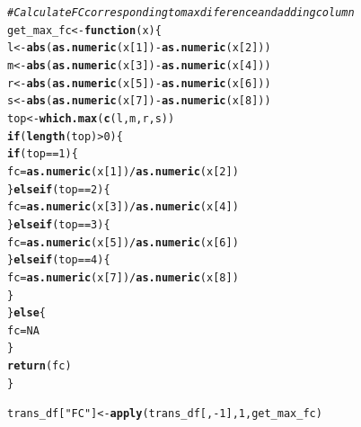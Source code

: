 \documentclass[12pt, a4paper]{article}\usepackage[]{graphicx}\usepackage[]{color}
\makeatletter
\newcommand{\hlnum}[1]{\textcolor[rgb]{0.686,0.059,0.569}{#1}}%
\newcommand{\hlstr}[1]{\textcolor[rgb]{0.192,0.494,0.8}{#1}}%
\newcommand{\hlcom}[1]{\textcolor[rgb]{0.678,0.584,0.686}{\textit{#1}}}%
\newcommand{\hlopt}[1]{\textcolor[rgb]{0,0,0}{#1}}%
\newcommand{\hlstd}[1]{\textcolor[rgb]{0.345,0.345,0.345}{#1}}%
\newcommand{\hlkwa}[1]{\textcolor[rgb]{0.161,0.373,0.58}{\textbf{#1}}}%
\newcommand{\hlkwb}[1]{\textcolor[rgb]{0.69,0.353,0.396}{#1}}%
\newcommand{\hlkwc}[1]{\textcolor[rgb]{0.333,0.667,0.333}{#1}}%
\newcommand{\hlkwd}[1]{\textcolor[rgb]{0.737,0.353,0.396}{\textbf{#1}}}%
\newenvironment{kframe}{%
 \def\at@end@of@kframe{}%
 \ifinner\ifhmode%
  \def\at@end@of@kframe{\end{minipage}}%
  \begin{minipage}{\columnwidth}%
 \fi\fi%
 \def\FrameCommand##1{\hskip\@totalleftmargin \hskip-\fboxsep
 \colorbox{shadecolor}{##1}\hskip-\fboxsep
     \hskip-\linewidth \hskip-\@totalleftmargin \hskip\columnwidth}%
 \MakeFramed {\advance\hsize-\width
   \@totalleftmargin\z@ \linewidth\hsize
   \@setminipage}}%
 {\par\unskip\endMakeFramed%
 \at@end@of@kframe}
\newenvironment{knitrout}{}{} %
\makeatother
\begin{document}
\begin{knitrout}
\begin{kframe}
\begin{alltt}
\hlcom{#Calculate FC corresponding to max diference and adding column}
\hlstd{get_max_fc} \hlkwb{<-} \hlkwa{function}\hlstd{(}\hlkwc{x}\hlstd{)\{}
  \hlstd{l} \hlkwb{<-} \hlkwd{abs}\hlstd{(}\hlkwd{as.numeric}\hlstd{(x[}\hlnum{1}\hlstd{])} \hlopt{-} \hlkwd{as.numeric}\hlstd{(x[}\hlnum{2}\hlstd{]))}
  \hlstd{m} \hlkwb{<-} \hlkwd{abs}\hlstd{(}\hlkwd{as.numeric}\hlstd{(x[}\hlnum{3}\hlstd{])} \hlopt{-} \hlkwd{as.numeric}\hlstd{(x[}\hlnum{4}\hlstd{]))}
  \hlstd{r} \hlkwb{<-} \hlkwd{abs}\hlstd{(}\hlkwd{as.numeric}\hlstd{(x[}\hlnum{5}\hlstd{])} \hlopt{-} \hlkwd{as.numeric}\hlstd{(x[}\hlnum{6}\hlstd{]))}
  \hlstd{s} \hlkwb{<-} \hlkwd{abs}\hlstd{(}\hlkwd{as.numeric}\hlstd{(x[}\hlnum{7}\hlstd{])} \hlopt{-} \hlkwd{as.numeric}\hlstd{(x[}\hlnum{8}\hlstd{]))}
  \hlstd{top} \hlkwb{<-} \hlkwd{which.max}\hlstd{(}\hlkwd{c}\hlstd{(l,m,r,s))}
  \hlkwa{if} \hlstd{(}\hlkwd{length}\hlstd{(top)} \hlopt{>} \hlnum{0}\hlstd{)\{}
    \hlkwa{if} \hlstd{(top} \hlopt{==} \hlnum{1}\hlstd{) \{}
      \hlstd{fc} \hlkwb{=} \hlkwd{as.numeric}\hlstd{(x[}\hlnum{1}\hlstd{])}\hlopt{/}\hlkwd{as.numeric}\hlstd{(x[}\hlnum{2}\hlstd{])}
    \hlstd{\}} \hlkwa{else if} \hlstd{(top} \hlopt{==} \hlnum{2}\hlstd{) \{}
      \hlstd{fc} \hlkwb{=} \hlkwd{as.numeric}\hlstd{(x[}\hlnum{3}\hlstd{])}\hlopt{/}\hlkwd{as.numeric}\hlstd{(x[}\hlnum{4}\hlstd{])}
    \hlstd{\}} \hlkwa{else if} \hlstd{(top} \hlopt{==} \hlnum{3}\hlstd{) \{}
      \hlstd{fc} \hlkwb{=} \hlkwd{as.numeric}\hlstd{(x[}\hlnum{5}\hlstd{])}\hlopt{/}\hlkwd{as.numeric}\hlstd{(x[}\hlnum{6}\hlstd{])}
    \hlstd{\}} \hlkwa{else if} \hlstd{(top} \hlopt{==} \hlnum{4}\hlstd{) \{}
      \hlstd{fc} \hlkwb{=} \hlkwd{as.numeric}\hlstd{(x[}\hlnum{7}\hlstd{])}\hlopt{/}\hlkwd{as.numeric}\hlstd{(x[}\hlnum{8}\hlstd{])}
    \hlstd{\}}
  \hlstd{\}} \hlkwa{else} \hlstd{\{}
    \hlstd{fc} \hlkwb{=} \hlnum{NA}
  \hlstd{\}}
  \hlkwd{return}\hlstd{(fc)}
\hlstd{\}}

\hlstd{trans_df[}\hlstr{"FC"}\hlstd{]} \hlkwb{<-} \hlkwd{apply}\hlstd{(trans_df[,}\hlopt{-}\hlnum{1}\hlstd{],} \hlnum{1}\hlstd{, get_max_fc)}


\end{alltt}
\end{kframe}
\end{knitrout}
\end{document}
